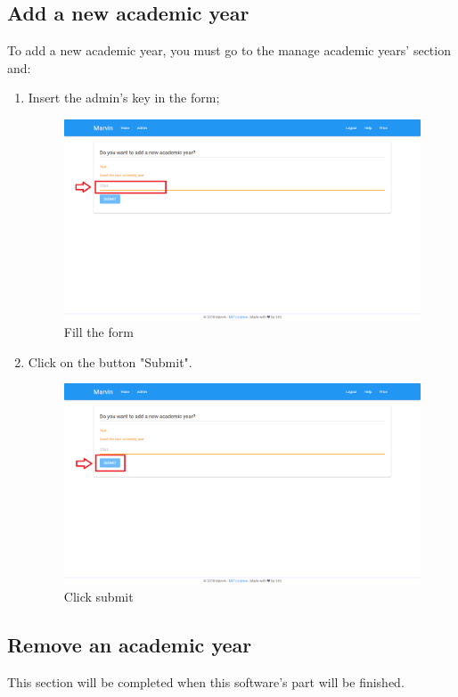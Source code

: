 \documentclass[ManualeUtente]{subfiles}
\begin{document}
\subsection{Add a new academic year}
To add a new academic year, you must go to the manage academic years' section and:
\begin{enumerate}
	\item Insert the admin's key in the form;
	\begin{figure}[H]
		\centering
		\includegraphics[width=0.7\linewidth]{image/UniversityAddYear1}
		\caption[Add year form]{Fill the form}
		\label{fig:Add a new academic year, fill the form}
	\end{figure}
	\item Click on the button "Submit".
	\begin{figure}[H]
		\centering
		\includegraphics[width=0.7\linewidth]{image/UniversityAddYear2}
		\caption[Add year submit]{Click submit}
		\label{fig:Add a new academic year, click submit}
	\end{figure}
\end{enumerate}

\subsection{Remove an academic year}
This section will be completed when this software's part will be finished.
\end{document}
